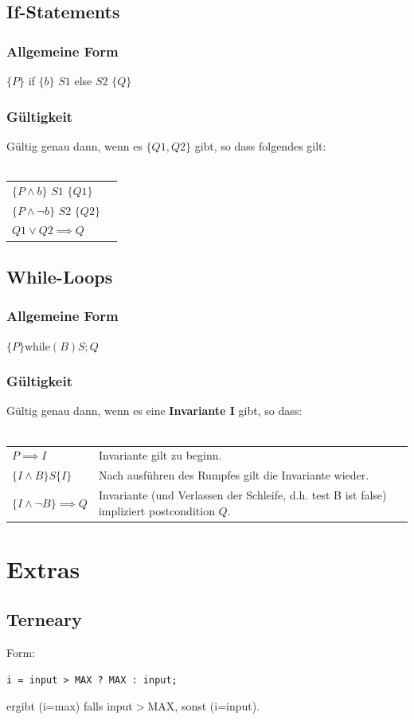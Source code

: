 \documentclass[12pt,a4paper]{article}
\begin{document}
\subsection{If-Statements}
\subsubsection{Allgemeine Form}
$\{P\}$ if $\{b\}$ $S1$ else $S2$ $\{Q\}$
\subsubsection{Gültigkeit}
Gültig genau dann, wenn es $\{Q1, Q2\}$ gibt, so dass folgendes gilt:\\\\
\begin{tabular}{ll}
$\{P \land b\}$ $S1$ $\{Q1\}$\\
$\{P \land \neg b \}$ $S2$ $\{Q2\}$\\
$Q1 \lor Q2 \implies Q$
\end{tabular}

\subsection{While-Loops}
\subsubsection{Allgemeine Form}
$\{P\} \text{while}(B) S; {Q}$
\subsubsection{Gültigkeit}
Gültig genau dann, wenn es eine \textbf{Invariante I} gibt, so dass:\\\\
\begin{tabularx}{\linewidth}{lX}
$P \implies I$ & Invariante gilt zu beginn.\\
$\{I \land B\} S \{I\}$ & Nach ausführen des Rumpfes gilt die Invariante wieder.\\
$\{I \land \neg B\} \implies Q$ & Invariante (und Verlassen der Schleife, d.h. test B ist false) impliziert postcondition $Q$.
\end{tabularx}
\section{Extras}
\subsection{Terneary}
Form:\\
\begin{verbatim}
i = input > MAX ? MAX : input;
\end{verbatim}
ergibt (i=max) falls input$>$MAX, sonst (i=input).
\end{document}
